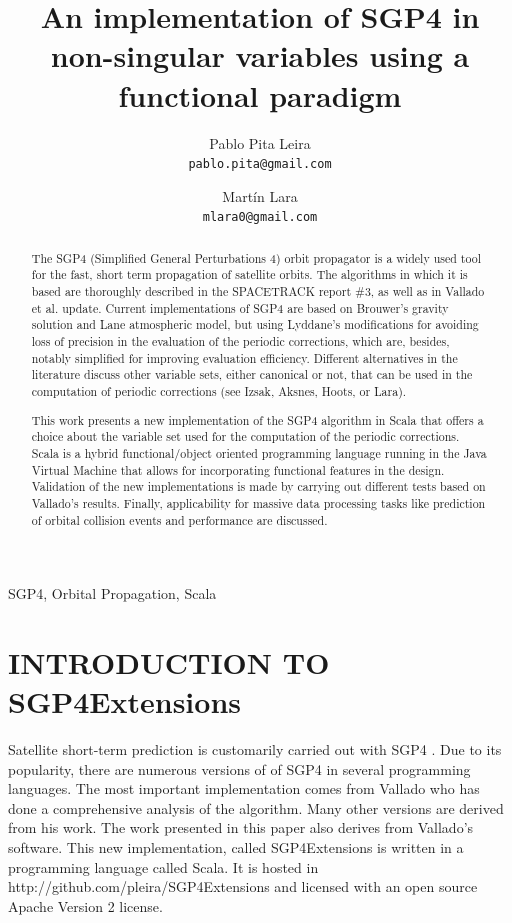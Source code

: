 \documentclass{article}
\title{An implementation of SGP4 in non-singular variables using a functional paradigm}
\author{
  Pablo Pita Leira\\
  \texttt{pablo.pita@gmail.com}
  \and
  Martín Lara\\
  \texttt{mlara0@gmail.com}
}
\begin{document}
%
\maketitle
%
\begin{abstract}
The SGP4 (Simplified General Perturbations 4) orbit propagator is a widely used tool for the fast, short term propagation of satellite orbits. The algorithms in which it is based are thoroughly described in the SPACETRACK report \#3, as well as in Vallado et al. update. Current implementations of SGP4 are based on Brouwer's gravity solution and Lane atmospheric model, but using Lyddane's modifications for avoiding loss of precision in the evaluation of the periodic corrections, which are, besides, notably simplified for improving evaluation efficiency. Different alternatives in the literature discuss other variable sets, either canonical or not, that can be used in the computation of periodic corrections (see Izsak, Aksnes, Hoots, or Lara).

This work presents a new implementation of the SGP4 algorithm in Scala that offers
a choice about the variable set used for the computation of the periodic corrections.
Scala is a hybrid functional/object oriented programming language running in the Java Virtual Machine
that allows for incorporating functional features in the design.
Validation of the new implementations is made by carrying out different tests based on Vallado's results. Finally, applicability for massive data processing tasks like prediction of orbital collision events and performance are discussed.

\end{abstract}
%
\begin{keywords}
SGP4, Orbital Propagation, Scala
\end{keywords}
%
\section{INTRODUCTION TO SGP4Extensions}
\label{sec:intro}

Satellite short-term prediction is customarily carried out
with SGP4 \cite{}. Due to its popularity, there are numerous versions of
of SGP4 in several programming languages. The most important implementation comes from Vallado
\cite{ValladoCrawford06}
who has done a comprehensive analysis of the algorithm. Many other versions
are derived from his work. The work presented in this paper also derives from Vallado's software.
This new implementation, called SGP4Extensions is written in a programming language called Scala.
It is hosted in http://github.com/pleira/SGP4Extensions and licensed
with an open source Apache Version 2 license.
\end{document}
